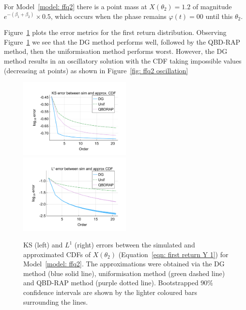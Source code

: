 For Model~\ref{model: ffq2} there is a point mass at \(X(\theta_2)=1.2\) of magnitude \(e^{-(\beta_1+\beta_2)}\times 0.5\), which occurs when the phase remains \(\varphi(t)=00\) until this \(\theta_2\).

Figure~\ref{fig: ffq return discts} plots the error metrics for the first return distribution. Observing Figure~\ref{fig: ffq return discts} we see that the DG method performs well, followed by the QBD-RAP method, then the uniformisation method performs worst. However, the DG method results in an oscillatory solution with the CDF taking impossible values (decreasing at points) as shown in Figure~\ref{fig: ffq2 oscillation}
\begin{figure}
	\centering
	\includegraphics[width=0.5\textwidth,trim={0.75cm 0.8cm 0.25cm 1.25cm},clip]{chapter6/figs/ffq/discts/ks_error_formatted.pdf}%
	\includegraphics[width=0.5\textwidth,trim={0.75cm 0.8cm 0.25cm 1.25cm},clip]{chapter6/figs/ffq/discts/l1_cdf_error_formatted.pdf}
	\caption{KS (left) and \(L^1\) (right) errors between the simulated and approximated CDFs of \(X(\theta_2)\) (Equation~\ref{eqn: first return Y 1}) for Model~\ref{model: ffq2}. The approximations were obtained via the DG method (blue solid line), uniformisation method (green dashed line) and QBD-RAP method (purple dotted line). Bootstrapped 90\% confidence intervals are shown by the lighter coloured bars surrounding the lines.} 
	\label{fig: ffq return discts} 
\end{figure}
